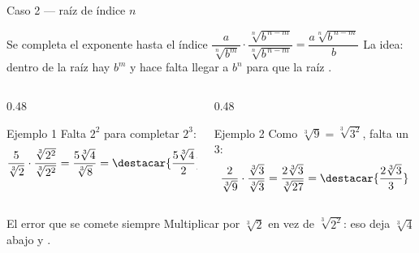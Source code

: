 \documentclass[aspectratio=169,10pt]{beamer}
\begin{document}
\begin{frame}{Caso 2 — raíz de índice $n$}
  \scriptsize
  \begin{block}{Se completa el exponente hasta el índice}
    \tiny
    $\dfrac{a}{\sqrt[n]{b^{m}}}\cdot\dfrac{\sqrt[n]{b^{\,n-m}}}
    {\sqrt[n]{b^{\,n-m}}} = \dfrac{a\sqrt[n]{b^{\,n-m}}}{b}$ \quad
    La idea: dentro de la raíz hay $b^{m}$ y hace falta llegar a $b^{n}$ para
    que la raíz .
  \end{block}

  \vspace{0.05cm}
  \begin{columns}[T,onlytextwidth]
    \begin{column}{0.48\textwidth}
      \begin{exampleblock}{Ejemplo 1}
        \tiny
        Falta $2^{2}$ para completar $2^{3}$:
        \[ \frac{5}{\sqrt[3]{2}}\cdot\frac{\sqrt[3]{2^{2}}}{\sqrt[3]{2^{2}}}
           = \frac{5\sqrt[3]{4}}{\sqrt[3]{8}}
           = \destacar{\frac{5\sqrt[3]{4}}{2}} \]
      \end{exampleblock}
    \end{column}
    \begin{column}{0.48\textwidth}
      \begin{exampleblock}{Ejemplo 2}
        \tiny
        Como $\sqrt[3]{9}=\sqrt[3]{3^{2}}$, falta un $3$:
        \[ \frac{2}{\sqrt[3]{9}}\cdot\frac{\sqrt[3]{3}}{\sqrt[3]{3}}
           = \frac{2\sqrt[3]{3}}{\sqrt[3]{27}}
           = \destacar{\frac{2\sqrt[3]{3}}{3}} \]
      \end{exampleblock}
    \end{column}
  \end{columns}

  \vspace{0.05cm}
  \begin{alertblock}{El error que se comete siempre}
    \tiny
    Multiplicar por $\sqrt[3]{2}$ en vez de $\sqrt[3]{2^{2}}$: eso deja
    $\sqrt[3]{4}$ abajo y .
  \end{alertblock}
\end{frame}
\end{document}
